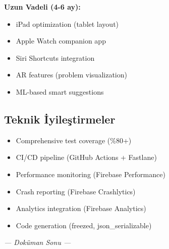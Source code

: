\documentclass[12pt,a4paper]{article}
\begin{document}
\textbf{Uzun Vadeli (4-6 ay):}
\begin{itemize}
    \item iPad optimization (tablet layout)
    \item Apple Watch companion app
    \item Siri Shortcuts integration
    \item AR features (problem visualization)
    \item ML-based smart suggestions
\end{itemize}

\subsection{Teknik İyileştirmeler}

\begin{itemize}
    \item Comprehensive test coverage (\%80+)
    \item CI/CD pipeline (GitHub Actions + Fastlane)
    \item Performance monitoring (Firebase Performance)
    \item Crash reporting (Firebase Crashlytics)
    \item Analytics integration (Firebase Analytics)
    \item Code generation (freezed, json\_serializable)
\end{itemize}

\vspace{1cm}

\begin{center}
\textit{--- Doküman Sonu ---}
\end{center}
\end{document}
